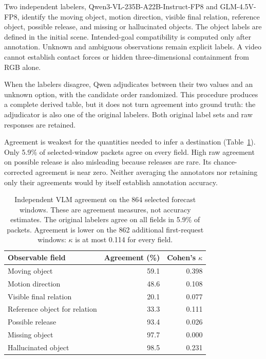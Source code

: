 \documentclass{article}
\begin{document}
Two independent labelers, Qwen3-VL-235B-A22B-Instruct-FP8 and GLM-4.5V-FP8, identify the moving object, motion direction, visible final relation, reference object, possible release, and missing or hallucinated objects. The object labels are defined in the initial scene. Intended-goal compatibility is computed only after annotation. Unknown and ambiguous observations remain explicit labels. A video cannot establish contact forces or hidden three-dimensional containment from RGB alone.

When the labelers disagree, Qwen adjudicates between their two values and an unknown option, with the candidate order randomized. This procedure produces a complete derived table, but it does not turn agreement into ground truth: the adjudicator is also one of the original labelers. Both original label sets and raw responses are retained.

Agreement is weakest for the quantities needed to infer a destination (Table~\ref{tab:forecast-agreement}). Only 5.9\% of selected-window packets agree on every field. High raw agreement on possible release is also misleading because releases are rare. Its chance-corrected agreement is near zero. Neither averaging the annotators nor retaining only their agreements would by itself establish annotation accuracy.

\begin{table}[t]
\centering
\small
\begin{tabular}{lrr}
\toprule
Observable field & Agreement (\%) & Cohen's $\kappa$ \\
\midrule
Moving object & 59.1 & 0.398 \\
Motion direction & 48.6 & 0.108 \\
Visible final relation & 20.1 & 0.077 \\
Reference object for relation & 33.3 & 0.111 \\
Possible release & 93.4 & 0.026 \\
Missing object & 97.7 & 0.000 \\
Hallucinated object & 98.5 & 0.231 \\
\bottomrule
\end{tabular}
\caption{Independent VLM agreement on the 864 selected forecast windows. These are agreement measures, not accuracy estimates. The original labelers agree on all fields in 5.9\% of packets. Agreement is lower on the 862 additional first-request windows: $\kappa$ is at most 0.114 for every field.}
\label{tab:forecast-agreement}
\end{table}
\end{document}
